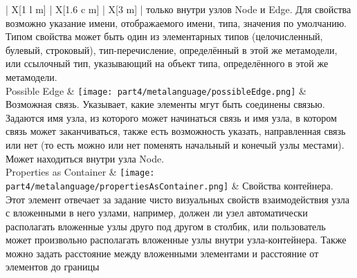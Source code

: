 \begin{center}
\begin{longtabu} {| X[1 l m] | X[1.6 c m] | X[3 m] |}
		                                                                                                                только внутри узлов Node и Edge. Для свойства возможно указание имени, отображаемого имени, 
		                                                                                                                типа, значения по умолчанию. Типом свойства может быть один из элементарных типов 
		                                                                                                                (целочисленный, булевый, строковый), тип-перечисление, определённый в этой же
		                                                                                                                метамодели, или ссылочный тип, указывающий на объект типа, определённого в этой же метамодели. \\
		Possible Edge               & \texttt{[image: part4/metalanguage/possibleEdge.png]}                & Возможная связь. Указывает, какие элементы мгут быть соединены связью. Задаются имя 
		                                                                                                                узла, из которого может начинаться связь и имя узла, в котором связь может заканчиваться, 
		                                                                                                                также есть возможность указать, направленная связь или нет (то есть можно или нет поменять 
		                                                                                                                начальный и конечый узлы местами). Может находиться внутри узла Node. \\
		Properties as Container     & \texttt{[image: part4/metalanguage/propertiesAsContainer.png]}       & Свойства контейнера. Этот элемент отвечает за задание чисто визуальных свойств 
		                                                                                                                взаимодействия узла с вложенными в него узлами, например, должен ли узел  
		                                                                                                                автоматически располагать вложенные узлы друго под другом в столбик, или пользователь 
		                                                                                                                может произвольно располагать вложенные узлы внутри узла-контейнера. Также можно задать 
		                                                                                                                расстояние между вложенными элементами и расстояние от элементов до границы 

\end{longtabu}
\end{center}
